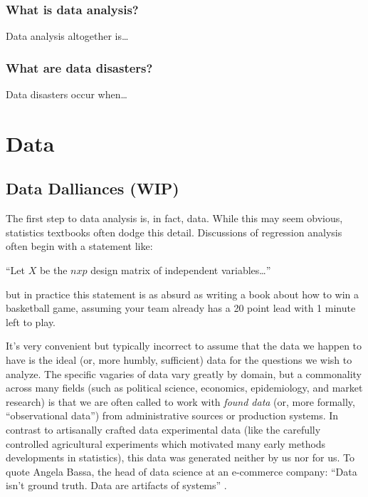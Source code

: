 \documentclass[
]{krantz}
\renewenvironment{quote}{\begin{VF}}{\end{VF}}
\begin{document}
\hypertarget{what-is-data-analysis}{%
\section{What is data analysis?}\label{what-is-data-analysis}}

Data analysis altogether is\ldots{}

\hypertarget{what-are-data-disasters}{%
\section{What are data disasters?}\label{what-are-data-disasters}}

Data disasters occur when\ldots{}

\hypertarget{part-data}{%
\part*{Data}\label{part-data}}


\hypertarget{data-dall}{%
\chapter{Data Dalliances (WIP)}\label{data-dall}}

The first step to data analysis is, in fact, data. While this may seem obvious, statistics textbooks often dodge this detail.
Discussions of regression analysis often begin with a statement like:

\begin{quote}
``Let \(X\) be the \(n x p\) design matrix of independent variables\ldots{}''
\end{quote}

but in practice this statement is as absurd as writing a book about how to win a basketball game, assuming your team already has a 20 point lead with 1 minute left to play.

It's very convenient but typically incorrect to assume that the data we happen to have is the ideal (or, more humbly, sufficient) data for the questions we wish to analyze.
The specific vagaries of data vary greatly by domain, but a commonality across many fields (such as political science, economics, epidemiology, and market research) is that we are often called to work with \emph{found data} (or, more formally, ``observational data'') from administrative sources or production systems.
In contrast to artisanally crafted data experimental data (like the carefully controlled agricultural experiments which motivated many early methods developments in statistics), this data was generated neither by us nor for us.
To quote Angela Bassa, the head of data science at an e-commerce company: ``Data isn't ground truth. Data are artifacts of systems'' \citep{bassa_2017}.
\end{document}
